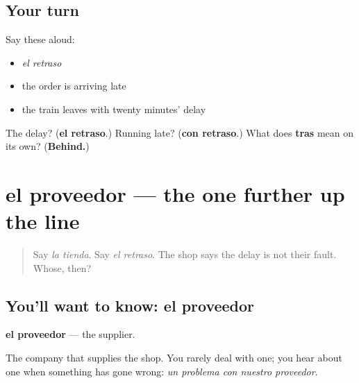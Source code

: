 \subsection*{Your turn}
Say these aloud:

\begin{itemize}
\raggedright
  \item \emph{el retraso}
  \item the order is arriving late
  \item the train leaves with twenty minutes' delay
\end{itemize}

\begin{tcolorbox}[breakable,colback=teal!4,colframe=teal!35!black,title={Before you move on}]
The delay? (\textbf{el retraso}.) Running late? (\textbf{con retraso}.) What does \textbf{tras} mean on its own? (\textbf{Behind.})
\end{tcolorbox}
\section[el proveedor]{el proveedor — the one further up the line}

\label{lesson:ES-C431-proveedor}



\begin{quote}
Say \emph{la tienda}. Say \emph{el retraso}. The shop says the delay is not their fault. Whose, then?
\end{quote}

\subsection*{You'll want to know: el proveedor}
\textbf{el proveedor} — the supplier.

The company that supplies the shop. You rarely deal with one; you hear about one when something has gone wrong: \emph{un problema con nuestro proveedor}.


